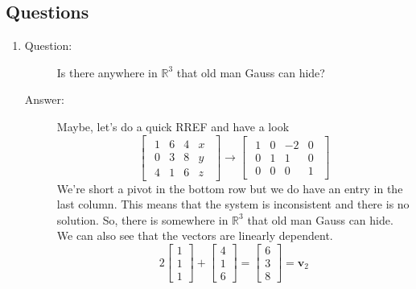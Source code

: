 \documentclass{article}
\begin{document}
        \subsection{Questions}
            \renewcommand{\labelenumi}{\alph{enumi}}
            \begin{enumerate}
                \item
                    \begin{description} 
                        \item[Question:]Is there anywhere in $\mathbb{R}^3$ that old man Gauss can hide?
                        \item[Answer:]
                            Maybe, let's do a quick RREF and have a look
                            \[
                            \begin{bmatrix}
                            \begin{array}{ccc|c}
                                1 & 6 &  4 & x \\
                                0 & 3 &  8 & y \\
                                4 & 1 &  6 & z
                            \end{array}
                            \end{bmatrix}
                            \rightarrow
                            \begin{bmatrix}
                            \begin{array}{ccc|c}
                                1 & 0 & -2 & 0 \\
                                0 & 1 &  1 & 0 \\
                                0 & 0 &  0 & 1
                            \end{array}
                            \end{bmatrix}
                            \]
                            We're short a pivot in the bottom row but we do have an entry in the last column.
                            This means that the system is inconsistent and there is no solution.
                            So, there is somewhere in $\mathbb{R}^3$ that old man Gauss can hide.
                            We can also see that the vectors are linearly dependent.
                            \[
                            2\begin{bmatrix}1\\1\\1\end{bmatrix}
                            +
                            \begin{bmatrix}4\\1\\6\end{bmatrix}
                            =
                            \begin{bmatrix}6\\3\\8\end{bmatrix} 
                            =
                            \mathbf{v}_2
                            \]
                    \end{description}
            \end{enumerate}
\end{document}
